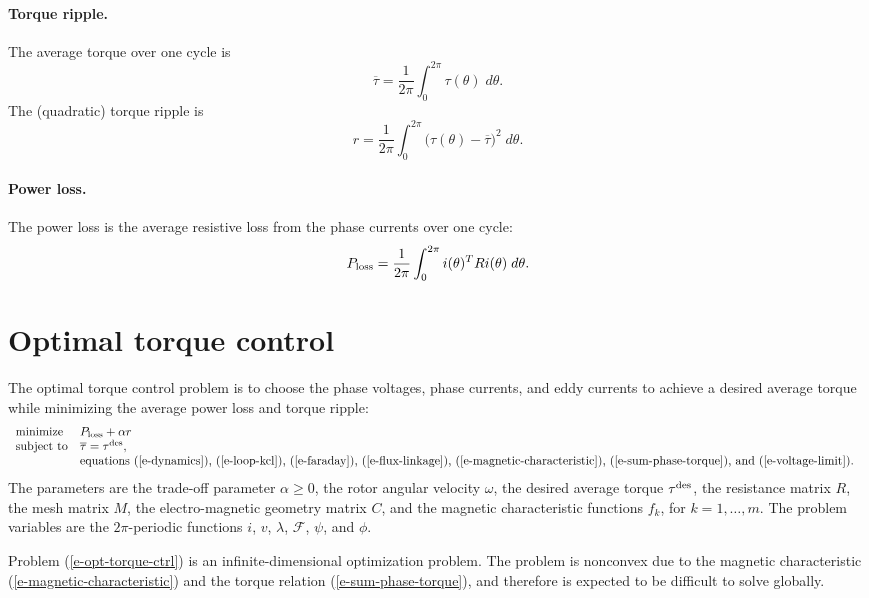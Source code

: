 \documentclass[11pt]{article}
\begin{document}
\paragraph{Torque ripple.}
The average torque over one cycle is 
\[
\overline \tau = \frac1{2\pi } 
\int_0^{2\pi} \tau(\theta) \; d\theta .
\]
The (quadratic) torque ripple is
\[
r = \frac1{2\pi} 
\int_0^{2\pi} \big(\tau(\theta) -\overline \tau \big)^2 \; d\theta.
\]

\paragraph{Power loss.}
The power loss is the average resistive loss from the phase
currents over one cycle:
\[
P_{\rm loss} = \frac1{2\pi}
\int_0^{2\pi} 
i(\theta)^T R i(\theta) \; d\theta .
\]

\section{Optimal torque control}
The optimal torque control problem is to 
choose the phase voltages, phase currents, and eddy currents 
to achieve a desired average
torque while minimizing the average power loss and torque ripple:
\begin{equation}
\begin{array}{ll}
\mbox{minimize} & P_{\rm loss} + \alpha  r \\ \mbox{subject to} & \overline \tau = \tau^{\rm des},  \\
                  & \mbox{equations
                    (\ref{e-dynamics}),
                    (\ref{e-loop-kcl}),
                    (\ref{e-faraday}),
                    (\ref{e-flux-linkage}),
(\ref{e-magnetic-characteristic}),
(\ref{e-sum-phase-torque}),
and
                    (\ref{e-voltage-limit}).
                    } \\
\end{array}
\label{e-opt-torque-ctrl}
\end{equation}
The parameters are the trade-off parameter $\alpha\geq 0$,
the rotor angular velocity $\omega$, 
the desired average torque $\tau^{\rm des}$,
the resistance matrix $R$,
the mesh matrix $M$,
the electro-magnetic geometry matrix $C$,
and the magnetic characteristic functions $f_k$, for $k = 1, \ldots, m$.
The problem variables are the $2\pi$-periodic functions
$i$, $v$, $\lambda$, $\mathcal F$, $\psi$, and $\phi$.

Problem (\ref{e-opt-torque-ctrl})
is an infinite-dimensional optimization problem.
The problem is nonconvex
due to the magnetic characteristic (\ref{e-magnetic-characteristic})
and the torque relation (\ref{e-sum-phase-torque}),
and therefore is expected to be difficult to solve globally.
\end{document}
